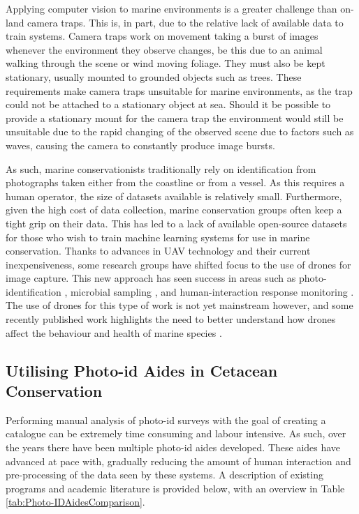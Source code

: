 Applying computer vision to marine environments is a greater challenge than on-land camera traps. This is, in part, due to the relative lack of available data to train systems. Camera traps work on movement taking a burst of images whenever the environment they observe changes, be this due to an animal walking through the scene or wind moving foliage. They must also be kept stationary, usually mounted to grounded objects such as trees. These requirements make camera traps unsuitable for marine environments, as the trap could not be attached to a stationary object at sea. Should it be possible to provide a stationary mount for the camera trap the environment would still be unsuitable due to the rapid changing of the observed scene due to factors such as waves, causing the camera to constantly produce image bursts. 

As such, marine conservationists traditionally rely on identification from photographs taken either from the coastline or from a vessel. As this requires a human operator, the size of datasets available is relatively small. Furthermore, given the high cost of data collection, marine conservation groups often keep a tight grip on their data. This has led to a lack of available open-source datasets for those who wish to train machine learning systems for use in marine conservation. Thanks to advances in UAV technology and their current inexpensiveness, some research groups have shifted focus to the use of drones for image capture. This new approach has seen success in areas such as photo-identification \cite{bogucki_applying_2019, gray_drones_2019}, microbial sampling \cite{centelleghe_use_2020}, and human-interaction response monitoring \cite{fiori_using_2020}. The use of drones for this type of work is not yet mainstream however, and some recently published work highlights the need to better understand how drones affect the behaviour and health of marine species \cite{giles_responses_2020, bevan_measuring_2018, ramos_bottlenose_2018, pomeroy_assessing_2015}. 

\subsection{Utilising Photo-id Aides in Cetacean Conservation}\label{ch:Background,sec:conTech,sub:photoIDAides}

Performing manual analysis of photo-id surveys with the goal of creating a catalogue can be extremely time consuming and labour intensive. As such, over the years there have been multiple photo-id aides developed. These aides have advanced at pace with, gradually reducing the amount of human interaction and pre-processing of the data seen by these systems. A description of existing programs and academic literature is provided below, with an overview in Table \ref{tab:Photo-IDAidesComparison}.

